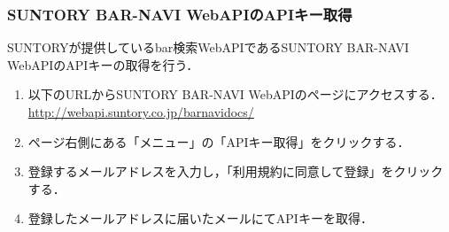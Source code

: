 \documentclass[fleqn, 14pt]{extarticlej}
\begin{document}
\subsubsection{SUNTORY BAR-NAVI WebAPIのAPIキー取得}
\label{ss:bar}
SUNTORYが提供しているbar検索WebAPIであるSUNTORY BAR-NAVI WebAPIのAPIキーの取得を行う．
\begin{enumerate}
\item 以下のURLからSUNTORY BAR-NAVI WebAPIのページにアクセスする．\\
  \url{http://webapi.suntory.co.jp/barnavidocs/}

\item ページ右側にある「メニュー」の「APIキー取得」をクリックする．
\item 登録するメールアドレスを入力し，「利用規約に同意して登録」をクリックする．
\item \label{item1}登録したメールアドレスに届いたメールにてAPIキーを取得．

\end{enumerate}
\end{document}
